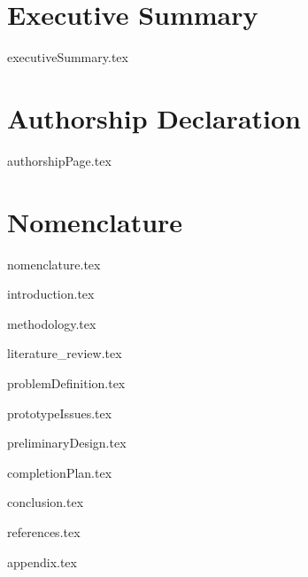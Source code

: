 \documentclass[a4paper,11pt]{article}
\begin{document}
\newpage
{}
\pagestyle{fancy} %
\fancyhf{} %
\fancyhead[L]{\leftmark}
\fancyhead[R]{\rightmark}
\fancyfoot[C]{\thepage} %
\renewcommand{\footrulewidth}{0.4pt} %
\section*{Executive Summary}
{executiveSummary.tex}

\newpage
\section*{Authorship Declaration}
{authorshipPage.tex}

\newpage
\tableofcontents

\newpage
\listoffigures

\newpage
\listoftables

\newpage
\section*{Nomenclature}
{nomenclature.tex}

\justifying
\newpage
{}
{introduction.tex}

\newpage
{methodology.tex}

\newpage
{literature_review.tex}

\newpage
{problemDefinition.tex}

\newpage
{prototypeIssues.tex}

\newpage
{preliminaryDesign.tex}

\newpage
{completionPlan.tex}

\newpage
{conclusion.tex}

\newpage
{references.tex}

\newpage
{appendix.tex}
\end{document}
